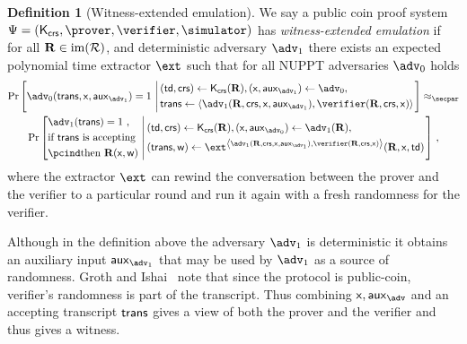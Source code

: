 \documentclass[runningheads,11pt]{llncs}
\theoremstyle{definition}
\newtheorem{definition}[theorem]{Definition}
\begin{document}
\begin{definition}[Witness-extended emulation]
	\label{def:wit_ext_em}
	We say a public coin proof system $\proofsystem = (\kcrs, \prover, \verifier,
  \simulator)$ has \emph{witness-extended emulation} if for all $\mathbf{R} \in
  \operatorname{im}(\mathcal{R})$, and deterministic adversary $\adv_1$ there exists an
  expected polynomial time extractor $\ext$  such that for all NUPPT adversaries $\adv_0$ holds
		\begin{multline*}
		\Pr\left[\adv_0 (\trans, \inp, \aux_{\adv_1}) = 1 \,\left|\,
		\begin{aligned}
				& (\td, \crs) \gets \kcrs(\REL), (\inp, \aux_{\adv_1}) \gets \adv_0, \\
				& \trans \gets \ip{\adv_1(\REL, \crs, \inp, \aux_{\adv_1})}{\verifier(\REL, \crs, \inp)}
			\end{aligned}
		\right.
		\right]
		 \approx_\secpar \\
		 \Pr\left[
			\begin{aligned}
				& \adv_1 (\trans) = 1\ , \\
				& \text{if $\trans$ is accepting} \\
				& \pcind \text{then $\REL(\inp, \wit)$}
			\end{aligned}\,\left|\,
			\begin{aligned}
				& (\td, \crs) \gets \kcrs(\REL), (\inp, \aux_{\adv_0}) \gets \adv_1(\REL), \\
				& (\trans, \wit )\gets \ext^{\ip{\adv_1(\REL, \crs, \inp, \aux_{\adv_1})}{\verifier(\REL, \crs, \inp)}}(\REL, \inp, \td)
			\end{aligned}
			\vphantom{\begin{aligned}
				\adv (\trans) = 1, \\
				\text{if $\trans{}$ is accepting} \\
				\pcind \text{then $\REL(\inp, \wit)$}
			\end{aligned}}\right.
			\right]\,,
\end{multline*}
where the extractor $\ext$ can rewind the conversation between the prover and the verifier to a particular round and run it again with a fresh randomness for the verifier.
\end{definition}
Although in the definition above the adversary $\adv_1$ is deterministic it obtains an auxiliary input $\aux_{\adv_1}$ that may be used by $\adv_1$ as a source of randomness. Groth and Ishai~\cite{EC:GroIsh08} note that since the protocol is public-coin, verifier's randomness is part of the transcript. Thus combining $\inp, \aux_\adv$ and an accepting transcript $\mathsf{trans}$ gives a view of both the prover and the verifier and thus gives a witness.
\end{document}
